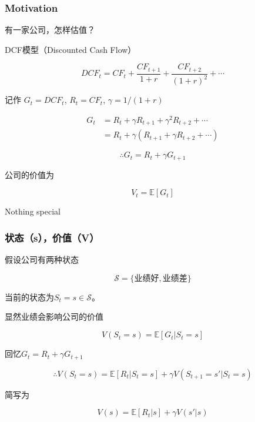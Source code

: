 \documentclass[8pt]{beamer}
\begin{document}

\begin{frame}
\frametitle{Motivation}

有一家公司，怎样估值？\pause

\vspace{1em}

DCF模型（Discounted Cash Flow）

\[
DCF_t=CF_t+\frac{CF_{t+1}}{1+r}+\frac{CF_{t+2}}{(1+r)^2}+\cdots
\]

\pause

\vspace{1em}

记作 $G_t=DCF_t$, $R_t=CF_t$, $\gamma=1/(1+r)$

\[
\begin{aligned}
G_t&=R_t+\gamma R_{t+1}+\gamma^2 R_{t+2}+\cdots\\
&=R_t+\gamma (R_{t+1}+\gamma R_{t+2}+\cdots)
\end{aligned}
\]

\[
\therefore G_t=R_t+\gamma G_{t+1}
\]

\pause

公司的价值为

\[
V_t=\mathbb{E}[G_t]
\]

\vspace{1em}

Nothing special


\end{frame}


\begin{frame}
\frametitle{状态（s），价值（V）}

假设公司有两种状态

\[
\mathcal{S}=\{\text{业绩好}, \text{业绩差}\}
\]


当前的状态为$S_t=s\in \mathcal{S}$。 

\vspace{1em}
显然业绩会影响公司的价值

\[
V(S_t=s)=\mathbb{E}[G_t|S_t=s]
\]

回忆$G_t=R_t+\gamma G_{t+1}$

\[
\therefore V(S_t=s)=\mathbb{E}[R_t|S_t=s]+\gamma V(S_{t+1}=s'|S_t=s)
\]

简写为

\[
V(s)=\mathbb{E}[R_t|s]+\gamma V(s'|s)
\]



\end{frame}
\end{document}
